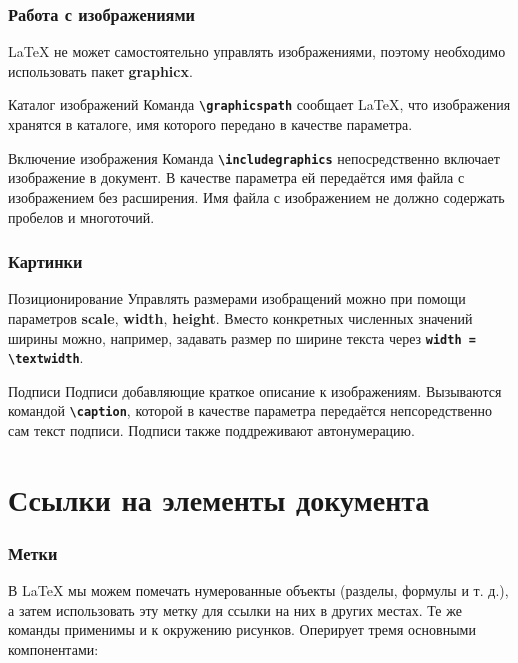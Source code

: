\documentclass[aspectratio=169]{beamer}
\begin{document}
\begin{frame}
\frametitle{Работа с изображениями}
\LaTeX{} не может самостоятельно управлять изображениями, поэтому необходимо использовать пакет \textbf{graphicx}.
\begin{exampleblock}{Каталог изображений}
Команда \texttt{\textbf{\textbackslash graphicspath}} сообщает \LaTeX{}, что изображения хранятся в каталоге, имя которого передано в качестве параметра.
\end{exampleblock}
\begin{exampleblock}{Включение изображения}
Команда \texttt{\textbf{\textbackslash includegraphics}} непосредственно включает изображение в документ.
В качестве параметра ей передаётся имя файла с изображением без расширения.
Имя файла с изображением не должно содержать пробелов и многоточий.
\end{exampleblock}
\end{frame}

\begin{frame}
\frametitle{Картинки}
\begin{exampleblock}{Позиционирование}
Управлять размерами изобращений можно при помощи параметров \textbf{scale}, \textbf{width}, \textbf{height}.
Вместо конкретных численных значений ширины можно, например, задавать размер по ширине текста через \texttt{\textbf{width = \textbackslash textwidth}}.
\end{exampleblock}
\begin{exampleblock}{Подписи}
Подписи добавляющие краткое описание к изображениям.
Вызываются командой \texttt{\textbf{\textbackslash caption}}, которой в качестве параметра передаётся непсоредственно сам текст подписи.
Подписи также поддреживают автонумерацию.
\end{exampleblock}
\end{frame}

\section{Ссылки на элементы документа}

\begin{frame}
\frametitle{Метки}
В \LaTeX{} мы можем помечать нумерованные объекты (разделы, формулы и т. д.), а затем использовать эту метку для ссылки на них в других местах.
Те же команды применимы и к окружению рисунков.
Оперирует тремя основными компонентами:
\end{frame}
\end{document}
